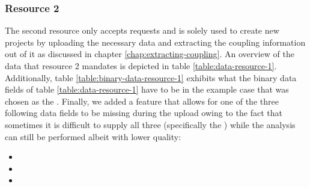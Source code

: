 \documentclass[12pt,a4paper]{report}
\begin{document}
\subsubsection{Resource 2}
The second resource only accepts  requests and is solely used to
create new projects by uploading the necessary data and extracting the
coupling information out of it as discussed in chapter \ref{chap:extracting-coupling}.
An overview of the data that resource 2 mandates is depicted in table
\ref{table:data-resource-1}.
Additionally, table \ref{table:binary-data-resource-1} exhibits what the
binary data fields of table \ref{table:data-resource-1} have to be in
the example case that  was chosen as the .
Finally, we added a feature that allows for one of the three following
data fields to be missing during the upload owing to the fact that sometimes
it is difficult to supply all three (specifically the )
while the analysis can still be performed albeit with lower quality:
\begin{itemize}[noitemsep]
    \item {}
    \item {}
    \item {}
\end{itemize}
\end{document}
